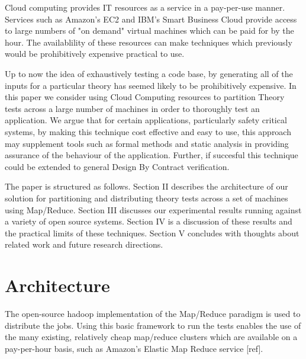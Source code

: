 \documentclass[10pt,journal,cspaper,compsoc]{IEEEtran}
\begin{document}
Cloud computing provides IT resources as a service in a pay-per-use manner. Services such as Amazon's EC2 and IBM's Smart Business Cloud provide access to large numbers of "on demand" virtual machines which can be paid for by the hour. The availablility of these resources can make techniques which previously would be prohibitively expensive practical to use.

Up to now the idea of exhaustively testing a code base, by generating all of the inputs for a particular theory has seemed likely to be prohibitively expensive. In this paper we consider using Cloud Computing resources to partition Theory tests across a large number of machines in order to thoroughly test an application. We argue that for certain applications, particularly safety critical systems, by making this technique cost effective and easy to use, this approach may supplement tools such as formal methods and static analysis in providing assurance of the behaviour of the application. Further, if succesful this technique could be extended to general Design By Contract verification.

The paper is structured as follows. Section II describes the architecture of our solution for partitioning and distributing theory tests across a set of machines using Map/Reduce. Section III discusses our experimental results running against a variety of open source systems. Section IV is a discussion of these results and the practical limits of these techniques. Section V concludes with thoughts about related work and future research directions. 

% 
% 
% 
% 

\section{Architecture}

The open-source hadoop implementation of the Map/Reduce paradigm is used to distribute the jobs. Using this basic framework to run the tests enables the use of the many existing, relatively cheap map/reduce clusters which are available on a pay-per-hour basis, such as Amazon’s Elastic Map Reduce service [ref]. 
\end{document}
